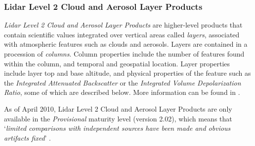 \subsubsection{Lidar Level 2 Cloud and Aerosol Layer Products}
\textit{Lidar Level 2 Cloud and Aerosol Layer Products} are higher-level
products that contain
scientific values integrated over vertical areas called \textit{layers},
associated with atmospheric features such as clouds and aerosols. Layers are
contained in a
procession of \textit{columns}. Column properties include the number of features
found within the column, and temporal and geospatial location. Layer properties
include layer top and base altitude, and physical properties of the feature such
as the \textit{﻿Integrated Attenuated Backscatter} or the \textit{Integrated
Volume Depolarization Ratio}, some of which are described below. More
information can be found in
\cite{CALIPSO_QualityStatementsLidarLevel2CloudAndAerosolProfileProducts}.

As of April 2010, Lidar Level 2 Cloud and Aerosol Layer Products
are only available in the \textit{Provisional} maturity level (version 2.02),
which means that
`\textit{limited comparisons with independent sources have been made and obvious
artifacts fixed}' \citep{CALIPSO_QualityStatements}.


